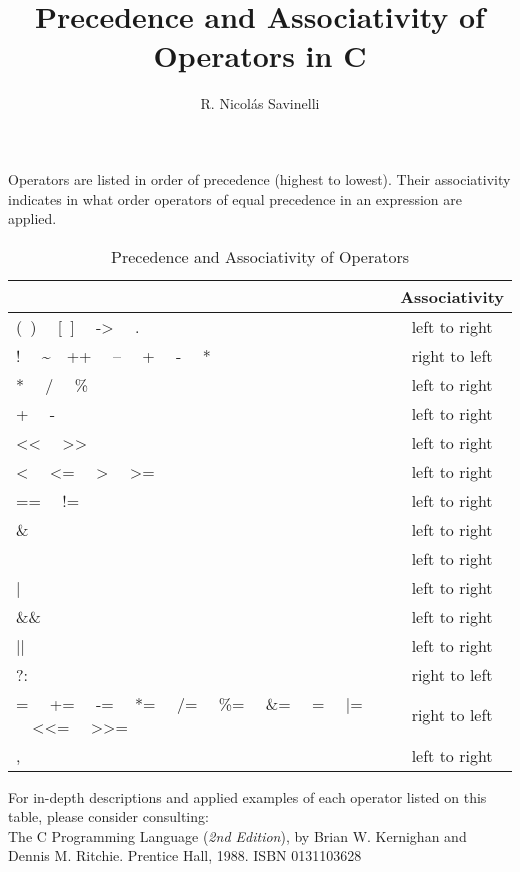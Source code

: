 \documentclass[letter]{article}
\title{\bf{Precedence and Associativity of Operators in C}}
\author{R. Nicolás Savinelli}
\begin{document}
\maketitle{}

Operators are listed in order of precedence (highest to lowest).
Their associativity indicates in what order operators of equal precedence in
an expression are applied.

\begin{table}[!h]
\begin{tabular}{| L | c |}
\hline
{} & \bf{Associativity} \\ \hline
(\ ) \ \ [\ ] \ \ -> \ \ . & left to right \\ \hline
! \ \ \sim \ \ ++ \ \ -- \ \ + \ \ - \ \ * \ \  & right to left \\ \hline
* \ \ / \ \ \% & left to right \\ \hline
+ \ \ - \ \ & left to right \\ \hline
<< \ \ >> \ \ & left to right \\ \hline
< \ \ <= \ \ > \ \ >= & left to right \\ \hline
== \ \ != \ \ & left to right \\ \hline
\& & left to right \\ \hline
\hat{} & left to right \\ \hline
| & left to right \\ \hline
\&\& & left to right \\ \hline
|| & left to right \\ \hline
?: & right to left \\ \hline
= \ \ += \ \ -= \ \ *= \ \ /= \ \ \%= \ \ \&= \ \ \hat{}= \ \ |= \ \ <<= \ \ >>= & right to left \\ \hline
, & left to right \\ \hline
\hline
\end{tabular}
\caption{Precedence and Associativity of Operators}
\end{table}

\noindent
For in-depth descriptions and applied examples of each operator listed on
this table, please consider consulting: \\

\noindent
The C Programming Language ({\it{2nd Edition}}), by Brian W. Kernighan and
Dennis M. Ritchie. Prentice Hall, 1988. ISBN 0131103628
\end{document}

